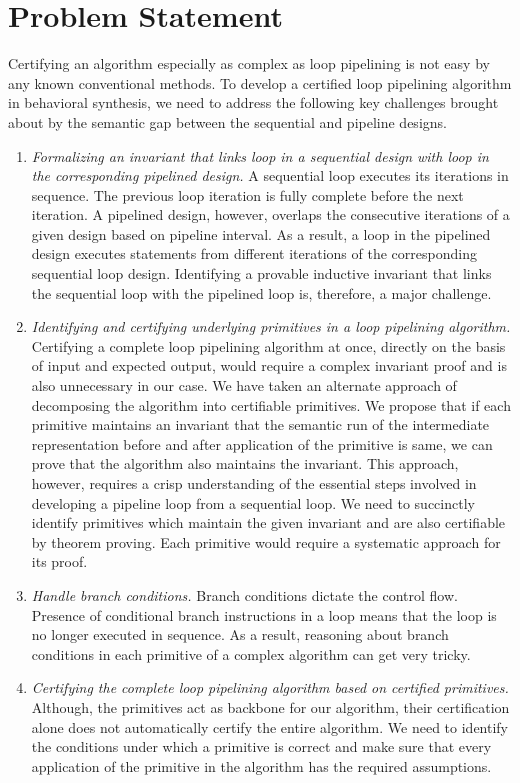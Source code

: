 \section{Problem Statement}
Certifying an algorithm especially as complex as loop pipelining is
not easy by any known conventional methods.
To develop a certified loop pipelining algorithm in behavioral synthesis,
we need to address the following key challenges brought about by the semantic
gap between the sequential and pipeline designs.
\begin{enumerate}[--]
\item {\em Formalizing an invariant that links loop in a sequential design with loop in the corresponding pipelined design.} A sequential loop executes its iterations in sequence. The previous loop iteration is fully complete before the next iteration. A pipelined design, however, overlaps the consecutive iterations of a given design based on pipeline interval. As a result, a loop in the pipelined design executes statements from different iterations of the corresponding sequential loop design. Identifying a provable inductive invariant that links the sequential loop with the pipelined loop is, therefore, a major challenge.
\item {\em Identifying and certifying underlying primitives in a loop pipelining algorithm.} Certifying a complete loop pipelining algorithm at once, directly on the basis of input and expected output, would require a complex invariant proof and is also unnecessary in our case. We have taken an alternate approach of decomposing the algorithm into certifiable primitives.
We propose that if each primitive maintains an invariant that the semantic run of the intermediate representation before and after application of the primitive is same, we can prove that the algorithm also maintains the invariant. This approach, however, requires a crisp understanding of the essential steps involved in developing a pipeline loop from a sequential loop. We need to succinctly identify primitives which maintain the given invariant and are also certifiable by theorem proving. Each primitive would require a systematic approach for its proof.
\item {\em Handle branch conditions.}  Branch conditions dictate the control flow. Presence of conditional branch instructions in a loop means that the loop is no longer executed in sequence. As a result, reasoning about branch conditions in each primitive of a complex algorithm can get very tricky.
\item {\em Certifying the complete loop pipelining algorithm based on certified primitives.} Although, the primitives act as backbone for our algorithm, their certification alone does not automatically certify the entire algorithm. We need to identify the conditions under which a primitive is correct and make sure that every application of the primitive in the algorithm has the required assumptions.
\end{enumerate}

